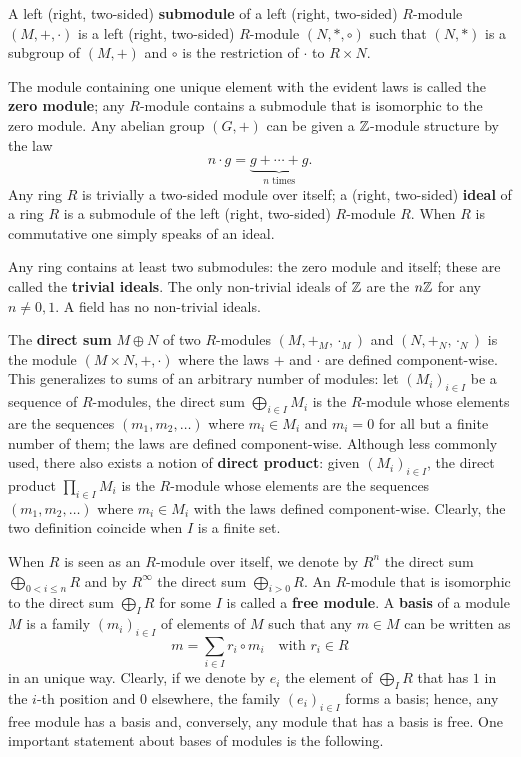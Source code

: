A left
(right,
two-sided) \textbf{submodule} of a left
(right, two-sided) $R$-module $(M,+,\cdot)$ is a left (right, two-sided)
$R$-module $(N,\ast,\circ)$ such that $(N,\ast)$ is a subgroup of
$(M,+)$ and $\circ$ is the restriction of $\cdot$ to $R\times N$.

The module containing one unique element with the evident laws is
called the \textbf{zero module}; any
$R$-module contains a submodule that is isomorphic to the zero module.
Any abelian group $(G,+)$ can be given a $\mathbb{Z}$-module structure by the
law
\[n\cdot g = \underbrace{g + \cdots + g}_{n\text{ times}} \text{.}\]
Any ring $R$ is trivially a two-sided module over itself; a
 (right,
two-sided) \textbf{ideal} of a ring $R$ is a
submodule of the left (right, two-sided) $R$-module $R$.  When $R$ is
commutative one simply speaks of an ideal.  

Any ring contains at least two submodules: the zero module and itself;
these are called the \textbf{trivial ideals}. The
only non-trivial ideals of $\mathbb{Z}$ are the $n\mathbb{Z}$ for any $n\ne0,1$. A
field has no non-trivial ideals.

The \textbf{direct sum} $M\oplus N$ of two
$R$-modules $(M,+_M,\cdot_M)$ and $(N,+_N,\cdot_N)$ is the module
$(M\times N,+,\cdot)$ where the laws $+$ and $\cdot$ are defined
component-wise. This generalizes to sums of an arbitrary number of
modules: let $(M_i)_{i\in I}$ be a sequence of $R$-modules, the direct
sum $\bigoplus_{i\in I}M_i$ is the $R$-module whose elements are the
sequences $(m_1,m_2,\ldots)$ where $m_i\in M_i$ and $m_i=0$ for all
but a finite number of them; the laws are defined component-wise.
Although less commonly used, there also exists a notion of
\textbf{direct product}: given $(M_i)_{i\in I}$,
the direct product $\prod_{i\in I}M_i$ is the $R$-module whose
elements are the sequences $(m_1,m_2,\ldots)$ where $m_i\in M_i$ with
the laws defined component-wise. Clearly, the two definition coincide
when $I$ is a finite set.

When $R$ is seen as an $R$-module over itself, we denote by $R^n$ the
direct sum $\bigoplus_{0<i\le n}R$ and by $R^\infty$ the direct sum
$\bigoplus_{i>0}R$. An $R$-module that is isomorphic to the direct sum
$\bigoplus_{I}R$ for some $I$ is called a
\textbf{free module}. A \textbf{basis}
of a module $M$ is a family $(m_i)_{i\in I}$ of elements of $M$ such
that any $m\in M$ can be written as 
\begin{equation}
  \label{eq:module-basis}
  m = \sum_{i\in I} r_i\circ m_i
  \quad\text{with $r_i\in R$}
\end{equation}
in an unique way. Clearly, if we denote by $e_i$ the element of
$\bigoplus_IR$ that has $1$ in the $i$-th position and $0$ elsewhere,
the family $(e_i)_{i\in I}$ forms a basis; hence, any free module has
a basis and, conversely, any module that has a basis is free. One
important statement about bases of modules is the following.


